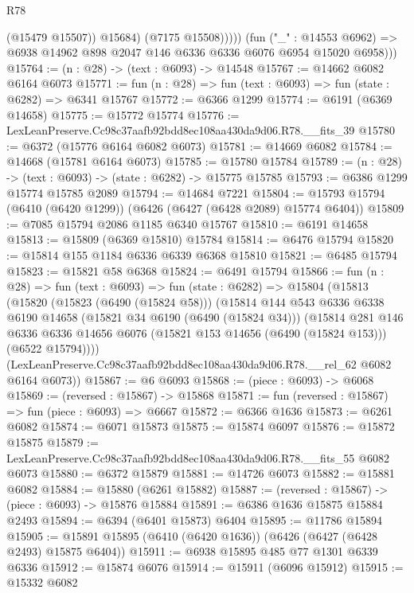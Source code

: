 \begin{lexlean}{R78}
\begin{coremodule}
                    (@15479 @15507))
                  @15684)
                (@7175 @15508)))))
        (fun ("_" : @14553 @6962) =>
        @6938 @14962 @898 @2047 @146 @6336 @6336 @6076 @6954 @15020 @6958)))
@15764 := (n : @28) -> (text : @6093) -> @14548
@15767 := @14662 @6082 @6164 @6073
@15771 := fun (n : @28) => fun (text : @6093) => fun (state : @6282) => @6341 @15767
@15772 := @6366 @1299
@15774 := @6191 (@6369 @14658)
@15775 := @15772 @15774
@15776 := LexLeanPreserve.Cc98c37aafb92bdd8ec108aa430da9d06.R78.__fits_39
@15780 := @6372 (@15776 @6164 @6082 @6073)
@15781 := @14669 @6082
@15784 := @14668 (@15781 @6164 @6073)
@15785 := @15780 @15784
@15789 := (n : @28) -> (text : @6093) -> (state : @6282) -> @15775 @15785
@15793 := @6386 @1299 @15774 @15785 @2089
@15794 := @14684 @7221
@15804 := @15793 @15794 (@6410 (@6420 @1299)) (@6426 (@6427 (@6428 @2089) @15774 @6404))
@15809 := @7085 @15794 @2086 @1185 @6340 @15767
@15810 := @6191 @14658
@15813 := @15809 (@6369 @15810) @15784
@15814 := @6476 @15794
@15820 := @15814 @155 @1184 @6336 @6339 @6368 @15810
@15821 := @6485 @15794
@15823 := @15821 @58 @6368
@15824 := @6491 @15794
@15866 := fun (n : @28) =>
  fun (text : @6093) =>
  fun (state : @6282) =>
  @15804
    (@15813
      (@15820
        (@15823 (@6490 (@15824 @58)))
        (@15814
          @144
          @543
          @6336
          @6338
          @6190
          @14658
          (@15821 @34 @6190 (@6490 (@15824 @34)))
          (@15814
            @281
            @146
            @6336
            @6336
            @14656
            @6076
            (@15821 @153 @14656 (@6490 (@15824 @153)))
            (@6522 @15794))))
      (LexLeanPreserve.Cc98c37aafb92bdd8ec108aa430da9d06.R78.__rel_62 @6082 @6164 @6073))
@15867 := @6 @6093
@15868 := (piece : @6093) -> @6068
@15869 := (reversed : @15867) -> @15868
@15871 := fun (reversed : @15867) => fun (piece : @6093) => @6667
@15872 := @6366 @1636
@15873 := @6261 @6082
@15874 := @6071 @15873
@15875 := @15874 @6097
@15876 := @15872 @15875
@15879 := LexLeanPreserve.Cc98c37aafb92bdd8ec108aa430da9d06.R78.__fits_55 @6082 @6073
@15880 := @6372 @15879
@15881 := @14726 @6073
@15882 := @15881 @6082
@15884 := @15880 (@6261 @15882)
@15887 := (reversed : @15867) -> (piece : @6093) -> @15876 @15884
@15891 := @6386 @1636 @15875 @15884 @2493
@15894 := @6394 (@6401 @15873) @6404
@15895 := @11786 @15894
@15905 := @15891 @15895 (@6410 (@6420 @1636)) (@6426 (@6427 (@6428 @2493) @15875 @6404))
@15911 := @6938 @15895 @485 @77 @1301 @6339 @6336
@15912 := @15874 @6076
@15914 := @15911 (@6096 @15912)
@15915 := @15332 @6082

\end{coremodule}
\end{lexlean}
